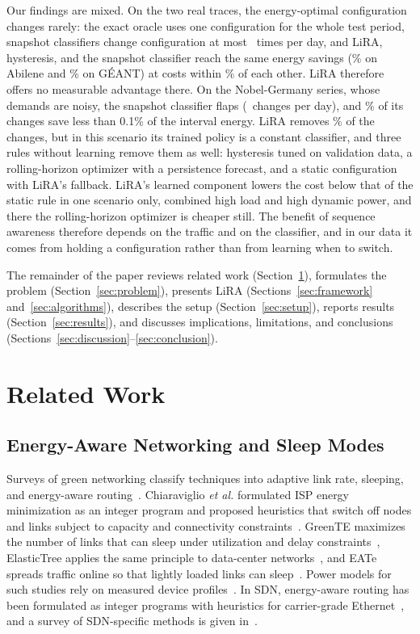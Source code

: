 \documentclass[preprint,12pt]{elsarticle}
\begin{document}
Our findings are mixed. On the two real traces, the energy-optimal configuration changes rarely: the exact oracle uses one configuration for the whole test period, snapshot classifiers change configuration at most \abiBFourchg\ times per day, and LiRA, hysteresis, and the snapshot classifier reach the same energy savings (\abiSav\% on Abilene and \geaSav\% on G\'{E}ANT) at costs within \realSpread\% of each other. LiRA therefore offers no measurable advantage there. On the Nobel-Germany series, whose demands are noisy, the snapshot classifier flaps (\nobBFourchg\ changes per day), and \gainTenthShare\% of its changes save less than 0.1\% of the interval energy. LiRA removes \nobY\% of the changes, but in this scenario its trained policy is a constant classifier, and three rules without learning remove them as well: hysteresis tuned on validation data, a rolling-horizon optimizer with a persistence forecast, and a static configuration with LiRA's fallback. LiRA's learned component lowers the cost below that of the static rule in one scenario only, combined high load and high dynamic power, and there the rolling-horizon optimizer is cheaper still. The benefit of sequence awareness therefore depends on the traffic and on the classifier, and in our data it comes from holding a configuration rather than from learning when to switch.

The remainder of the paper reviews related work (Section~\ref{sec:related}), formulates the problem (Section~\ref{sec:problem}), presents LiRA (Sections~\ref{sec:framework} and~\ref{sec:algorithms}), describes the setup (Section~\ref{sec:setup}), reports results (Section~\ref{sec:results}), and discusses implications, limitations, and conclusions (Sections~\ref{sec:discussion}--\ref{sec:conclusion}).

\section{Related Work}\label{sec:related}

\subsection{Energy-Aware Networking and Sleep Modes}

Surveys of green networking classify techniques into adaptive link rate, sleeping, and energy-aware routing~\cite{bianzino2012survey,bolla2011energy}. Chiaraviglio \emph{et al.} formulated ISP energy minimization as an integer program and proposed heuristics that switch off nodes and links subject to capacity and connectivity constraints~\cite{chiaraviglio2012minimizing}. GreenTE maximizes the number of links that can sleep under utilization and delay constraints~\cite{zhang2010greente}, ElasticTree applies the same principle to data-center networks~\cite{heller2010elastictree}, and EATe spreads traffic online so that lightly loaded links can sleep~\cite{vasic2010eate}. Power models for such studies rely on measured device profiles~\cite{mahadevan2009power,restrepo2009energy,vishwanath2014modeling}. In SDN, energy-aware routing has been formulated as integer programs with heuristics for carrier-grade Ethernet~\cite{maaloul2018carrier}, and a survey of SDN-specific methods is given in~\cite{assefa2019survey}.
\end{document}
